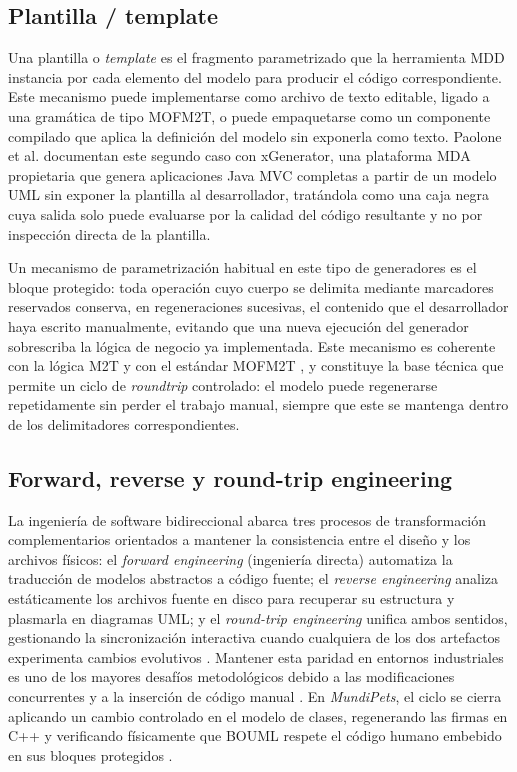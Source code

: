 \documentclass[journal,onecolumn]{IEEEtran}
\begin{document}
	\subsection{Plantilla / template}
	Una plantilla o \textit{template} es el fragmento parametrizado que la herramienta MDD instancia por cada elemento del modelo para producir el código correspondiente. Este mecanismo puede implementarse como archivo de texto editable, ligado a una gramática de tipo MOFM2T, o puede empaquetarse como un componente compilado que aplica la definición del modelo sin exponerla como texto. Paolone et al. \cite{Paolone2021} documentan este segundo caso con xGenerator, una plataforma MDA propietaria que genera aplicaciones Java MVC completas a partir de un modelo UML sin exponer la plantilla al desarrollador, tratándola como una caja negra cuya salida solo puede evaluarse por la calidad del código resultante y no por inspección directa de la plantilla.
	
	Un mecanismo de parametrización habitual en este tipo de generadores es el bloque protegido: toda operación cuyo cuerpo se delimita mediante marcadores reservados conserva, en regeneraciones sucesivas, el contenido que el desarrollador haya escrito manualmente, evitando que una nueva ejecución del generador sobrescriba la lógica de negocio ya implementada. Este mecanismo es coherente con la lógica M2T y con el estándar MOFM2T \cite{OMG2008MOFM2T}, y constituye la base técnica que permite un ciclo de \textit{roundtrip} controlado: el modelo puede regenerarse repetidamente sin perder el trabajo manual, siempre que este se mantenga dentro de los delimitadores correspondientes.
	
	\subsection{Forward, reverse y round-trip engineering}
	La ingeniería de software bidireccional abarca tres procesos de transformación complementarios orientados a mantener la consistencia entre el diseño y los archivos físicos: el \textit{forward engineering} (ingeniería directa) automatiza la traducción de modelos abstractos a código fuente; el \textit{reverse engineering} analiza estáticamente los archivos fuente en disco para recuperar su estructura y plasmarla en diagramas UML; y el \textit{round-trip engineering} unifica ambos sentidos, gestionando la sincronización interactiva cuando cualquiera de los dos artefactos experimenta cambios evolutivos \cite{Brambilla2017, Selic2003, Kannengiesser2021}. Mantener esta paridad en entornos industriales es uno de los mayores desafíos metodológicos debido a las modificaciones concurrentes y a la inserción de código manual \cite{Jongeling2022}. En \textit{MundiPets}, el ciclo se cierra aplicando un cambio controlado en el modelo de clases, regenerando las firmas en C++ y verificando físicamente que BOUML respete el código humano embebido en sus bloques protegidos \cite{GuiaMDD2026}.
	
\end{document}
